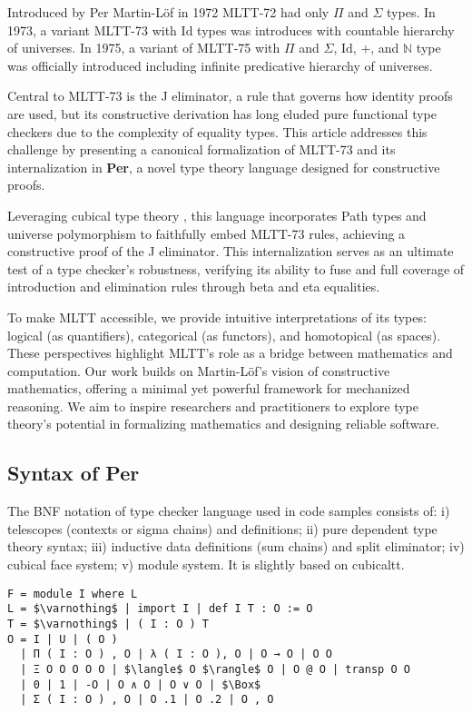 \documentclass{article}
\theoremstyle{definition}
\begin{document}
Introduced by Per Martin-Löf in 1972 \cite{Lof72} MLTT-72 had only $\Pi$ and $\Sigma$ types.
In 1973, a variant MLTT-73 with $\mathrm{Id}$ types was introduces with countable hierarchy of universes.
In 1975, a variant of MLTT-75 with $\Pi$ and $\Sigma$, $\mathrm{Id}$, $+$, and $\mathbb{N}$ type
was officially introduced \cite{Lof75} including infinite predicative hierarchy of universes.

Central to MLTT-73 is the J eliminator, a rule that governs how identity proofs
are used, but its constructive derivation has long eluded pure
functional type checkers due to the complexity of equality types.
This article addresses this challenge by presenting a canonical
formalization of MLTT-73 and its internalization in \textbf{Per},
a novel type theory language designed for constructive proofs.

Leveraging cubical type theory \cite{Mortberg17}, this language
incorporates Path types and universe polymorphism to faithfully
embed MLTT-73 rules, achieving a constructive proof of the J eliminator.
This internalization serves as an ultimate test of a type checker’s robustness,
verifying its ability to fuse and full coverage of
introduction and elimination rules through beta and eta equalities.

To make MLTT accessible, we provide intuitive interpretations
of its types: logical (as quantifiers), categorical (as functors),
and homotopical (as spaces). These perspectives highlight MLTT’s role
as a bridge between mathematics and computation. Our work builds on
Martin-Löf’s vision of constructive mathematics, offering a minimal
yet powerful framework for mechanized reasoning. We aim to inspire
researchers and practitioners to explore type theory’s potential in
formalizing mathematics and designing reliable software.

\subsection*{Syntax of Per}
The BNF notation of type checker language used in code samples consists of:
i) telescopes (contexts or sigma chains) and definitions;
ii) pure dependent type theory syntax;
iii) inductive data definitions (sum chains) and split eliminator;
iv) cubical face system;
v) module system. It is slightly based on cubicaltt.

\begin{lstlisting}[mathescape=true]
F = module I where L
L = $\varnothing$ | import I | def I T : O := O
T = $\varnothing$ | ( I : O ) T
O = I | U | ( O )
  | Π ( I : O ) , O | λ ( I : O ), O | O → O | O O
  | Ξ O O O O O | $\langle$ O $\rangle$ O | O @ O | transp O O
  | 0 | 1 | -O | O ∧ O | O ∨ O | $\Box$
  | Σ ( I : O ) , O | O .1 | O .2 | O , O
\end{lstlisting}
\end{document}

